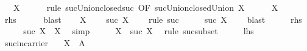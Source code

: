 \begin{isabellebody}
\ {\isachardoublequoteopen}{\isasymUnion}{\isasymC}\ {\isasymsubseteq}\ X{\isachardoublequoteclose}\isanewline
\ \ \ \ \isamarkupfalse%
\ {\isacharparenleft}{\kern0pt}rule\ suc{\isacharunderscore}{\kern0pt}Union{\isacharunderscore}{\kern0pt}closed{\isacharunderscore}{\kern0pt}suc\ {\isacharbrackleft}{\kern0pt}OF\ suc{\isacharunderscore}{\kern0pt}Union{\isacharunderscore}{\kern0pt}closed{\isacharunderscore}{\kern0pt}Union\ {\isacartoucheopen}X\ {\isasymin}\ {\isasymC}{\isacartoucheclose}{\isacharbrackright}{\kern0pt}{\isacharparenright}{\kern0pt}\isanewline
\ \ \isamarkupfalse%
\ {\isacartoucheopen}X\ {\isasymin}\ {\isasymC}{\isacartoucheclose}\ \isamarkupfalse%
\ {\isacharquery}{\kern0pt}rhs\isanewline
\ \ \ \ \isamarkupfalse%
\ blast\isanewline
{}\isamarkupfalse%
\isanewline
\ \ \isamarkupfalse%
\ {\isacartoucheopen}X\ {\isasymin}\ {\isasymC}{\isacartoucheclose}\ \isamarkupfalse%
\ {\isachardoublequoteopen}suc\ X\ {\isasymin}\ {\isasymC}{\isachardoublequoteclose}\ \isamarkupfalse%
\ {\isacharparenleft}{\kern0pt}rule\ suc{\isacharparenright}{\kern0pt}\isanewline
\ \ \isamarkupfalse%
\ \isamarkupfalse%
\ {\isachardoublequoteopen}suc\ X\ {\isasymsubseteq}\ {\isasymUnion}{\isasymC}{\isachardoublequoteclose}\ \isamarkupfalse%
\ blast\isanewline
\ \ \isamarkupfalse%
\ \isamarkupfalse%
\ {\isacharquery}{\kern0pt}rhs\isanewline
\ \ \isamarkupfalse%
\ \isamarkupfalse%
\ {\isachardoublequoteopen}suc\ X\ {\isasymsubseteq}\ X{\isachardoublequoteclose}\ \isamarkupfalse%
\ simp\isanewline
\ \ \isamarkupfalse%
\ \isamarkupfalse%
\ {\isachardoublequoteopen}X\ {\isasymsubseteq}\ suc\ X{\isachardoublequoteclose}\ \isamarkupfalse%
\ {\isacharparenleft}{\kern0pt}rule\ suc{\isacharunderscore}{\kern0pt}subset{\isacharparenright}{\kern0pt}\isanewline
\ \ \isamarkupfalse%
\ \isamarkupfalse%
\ {\isacharquery}{\kern0pt}lhs\ \isacommand{{\isachardot}{\kern0pt}{\isachardot}{\kern0pt}}\isamarkupfalse%
\isanewline
{}\isamarkupfalse%
%
\endisatagproof
{\isafoldproof}%
%
\isadelimproof
\isanewline
%
\endisadelimproof
\isanewline
{}\isamarkupfalse%
\ suc{\isacharunderscore}{\kern0pt}in{\isacharunderscore}{\kern0pt}carrier{\isacharcolon}{\kern0pt}\isanewline
\ \ \ {\isachardoublequoteopen}X\ {\isasymsubseteq}\ A{\isachardoublequoteclose}\isanewline

\end{isabellebody}
